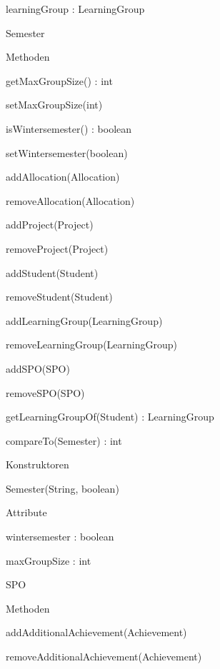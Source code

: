\documentclass[parskip=full]{scrartcl}
\begin{document}
\begin{itemPackage}
\begin{itemClass}
\begin{itemClassSub}
\begin{itemPlus}
\item learningGroup : LearningGroup
\end{itemPlus}
\end{itemClassSub}
\item Semester
\begin{itemClassSub}
\item Methoden
\begin{itemPlus}
\item getMaxGroupSize() : int
\item setMaxGroupSize(int)
\item isWintersemester() : boolean
\item setWintersemester(boolean)
\item addAllocation(Allocation)
\item removeAllocation(Allocation)
\item addProject(Project)
\item removeProject(Project)
\item addStudent(Student)
\item removeStudent(Student)
\item addLearningGroup(LearningGroup)
\item removeLearningGroup(LearningGroup)
\item addSPO(SPO)
\item removeSPO(SPO)
\item getLearningGroupOf(Student) : LearningGroup
\item compareTo(Semester) : int
\end{itemPlus}
\item Konstruktoren
\begin{itemPlus}
\item Semester(String, boolean)
\end{itemPlus}
\item Attribute 
\begin{itemPlus}
\item wintersemester : boolean
\item maxGroupSize : int
\end{itemPlus}
\end{itemClassSub}
\item SPO
\begin{itemClassSub}
\item Methoden
\begin{itemPlus}
\item addAdditionalAchievement(Achievement)
\item removeAdditionalAchievement(Achievement)

\end{itemPlus}
\end{itemClassSub}
\end{itemClass}
\end{itemPackage}
\end{document}

